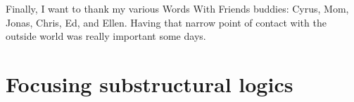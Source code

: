 \documentclass[12pt]{cmuthesis}
\begin{document}
\begin{acknowledgments}
  Finally, I want to thank my various Words With Friends buddies:
  Cyrus, Mom, Jonas, Chris, Ed, and Ellen. Having that narrow point of
  contact with the outside world was really important some days.

\end{acknowledgments}



\tableofcontents
\listoffigures %

\mainmatter


%
%
%
%
%




\part{Focusing substructural logics}
\end{document}
